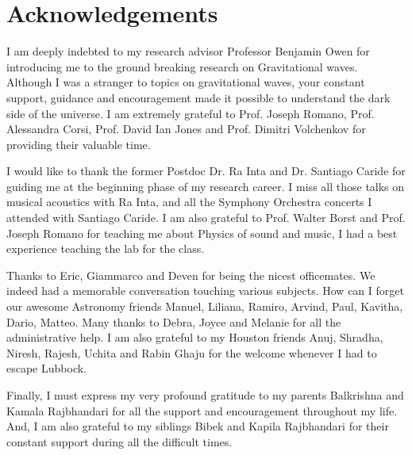 \documentclass{ttuthes2007}
\begin{document}
\frontmatter


\chapter{\textbf{Acknowledgements}}
I am  deeply indebted to my research advisor Professor Benjamin Owen for
introducing me to the ground breaking research on Gravitational waves. Although
I was a stranger to topics on gravitational waves, your constant support,
guidance and encouragement made it possible to understand the dark side of
the universe.  I am extremely grateful to  Prof. Joseph
Romano, Prof. Alessandra Corsi, Prof. David Ian Jones and Prof. Dimitri
Volchenkov for providing their valuable time. 

I would like to thank the former Postdoc Dr. Ra Inta and Dr. Santiago Caride for
guiding me at the beginning phase of my research career. I miss all those talks
on musical acoustics with Ra Inta, and all the Symphony Orchestra concerts I
attended with Santiago Caride. I am also grateful to Prof. Walter Borst and
Prof. Joseph Romano for teaching me about Physics of sound and music, I had a
best experience teaching the lab for the class. 

Thanks to Eric, Giammarco and Deven for being the nicest officemates. We indeed
had a memorable conversation touching various subjects. How can I forget our
awesome Astronomy friends Manuel, Liliana, Ramiro, Arvind, Paul, Kavitha,
Dario, Matteo. Many thanks to Debra, Joyce and Melanie for all the
administrative help. I am also grateful to my Houston
friends Anuj, Shradha, Niresh, Rajesh, Uchita and Rabin Ghaju for the welcome
whenever I had to escape Lubbock. 

Finally, I must express my very profound gratitude to my parents Balkrishna
and Kamala Rajbhandari for all the support and encouragement throughout my life. And, I am also
grateful to my siblings Bibek and Kapila Rajbhandari for their constant support
during all the difficult times.
 

\newpage
\end{document}
